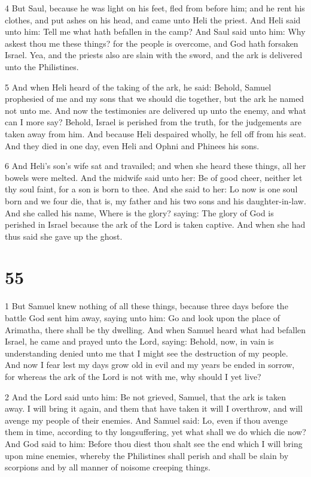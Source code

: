 \par 4 But Saul, because he was light on his feet, fled from before him; and he rent his clothes, and put ashes on his head, and came unto Heli the priest. And Heli said unto him: Tell me what hath befallen in the camp? And Saul said unto him: Why askest thou me these things? for the people is overcome, and God hath forsaken Israel. Yea, and the priests also are slain with the sword, and the ark is delivered unto the Philistines. 

\par 5 And when Heli heard of the taking of the ark, he said: Behold, Samuel prophesied of me and my sons that we should die together, but the ark he named not unto me. And now the testimonies are delivered up unto the enemy, and what can I more say? Behold, Israel is perished from the truth, for the judgements are taken away from him. And because Heli despaired wholly, he fell off from his seat. And they died in one day, even Heli and Ophni and Phinees his sons.

\par 6 And Heli's son's wife sat and travailed; and when she heard these things, all her bowels were melted. And the midwife said unto her: Be of good cheer, neither let thy soul faint, for a son is born to thee. And she said to her: Lo now is one soul born and we four die, that is, my father and his two sons and his daughter-in-law. And she called his name, Where is the glory? saying: The glory of God is perished in Israel because the ark of the Lord is taken captive. And when she had thus said she gave up the ghost.

\chapter{55}

\par 1 But Samuel knew nothing of all these things, because three days before the battle God sent him away, saying unto him: Go and look upon the place of Arimatha, there shall be thy dwelling. And when Samuel heard what had befallen Israel, he came and prayed unto the Lord, saying: Behold, now, in vain is understanding denied unto me that I might see the destruction of my people. And now I fear lest my days grow old in evil and my years be ended in sorrow, for whereas the ark of the Lord is not with me, why should I yet live? 

\par 2 And the Lord said unto him: Be not grieved, Samuel, that the ark is taken away. I will bring it again, and them that have taken it will I overthrow, and will avenge my people of their enemies. And Samuel said: Lo, even if thou avenge them in time, according to thy longsuffering, yet what shall we do which die now? And God said to him: Before thou diest thou shalt see the end which I will bring upon mine enemies, whereby the Philistines shall perish and shall be slain by scorpions and by all manner of noisome creeping things. 

